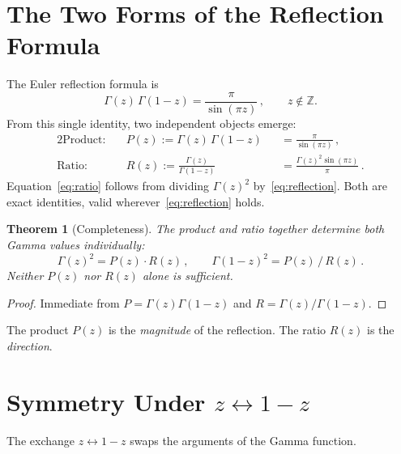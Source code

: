 \documentclass[12pt,reqno]{amsart}
\newtheorem{theorem}{Theorem}[section]
\theoremstyle{definition}
\theoremstyle{remark}
\newcommand{\ZZ}{\mathbb{Z}}
\begin{document}
\section{The Two Forms of the Reflection Formula}

The Euler reflection formula is
\begin{equation}\label{eq:reflection}
  \Gamma(z)\,\Gamma(1-z) = \frac{\pi}{\sin(\pi z)}\,,
  \qquad z \notin \ZZ.
\end{equation}
From this single identity, two independent objects emerge:
\begin{alignat}{2}
  \text{Product:}&\quad P(z) := \Gamma(z)\,\Gamma(1-z) &&= \frac{\pi}{\sin(\pi z)}\,,
  \label{eq:product}\\[4pt]
  \text{Ratio:}&\quad R(z) := \frac{\Gamma(z)}{\Gamma(1-z)}
  &&= \frac{\Gamma(z)^2\sin(\pi z)}{\pi}\,.
  \label{eq:ratio}
\end{alignat}
Equation~\eqref{eq:ratio} follows from dividing $\Gamma(z)^2$ by~\eqref{eq:reflection}. Both are exact identities, valid wherever~\eqref{eq:reflection} holds.

\begin{theorem}[Completeness]\label{thm:complete}
The product and ratio together determine both Gamma values individually:
\begin{equation}
  \Gamma(z)^2 = P(z) \cdot R(z)\,,\qquad
  \Gamma(1-z)^2 = P(z) \,/\, R(z)\,.
\end{equation}
Neither $P(z)$ nor $R(z)$ alone is sufficient.
\end{theorem}

\begin{proof}
Immediate from $P = \Gamma(z)\Gamma(1-z)$ and $R = \Gamma(z)/\Gamma(1-z)$.
\end{proof}

The product $P(z)$ is the \emph{magnitude} of the reflection.
The ratio $R(z)$ is the \emph{direction}.

\section{Symmetry Under $z \leftrightarrow 1-z$}

The exchange $z \leftrightarrow 1-z$ swaps the arguments of the Gamma function.
\end{document}
